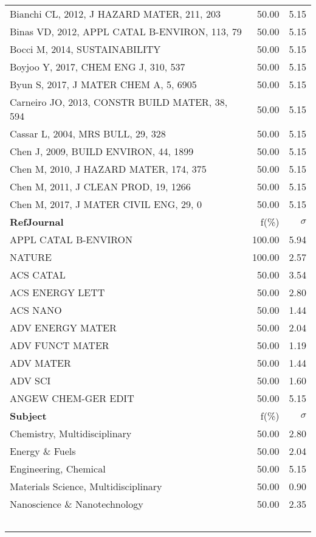\documentclass[a4paper,11pt]{report}
\begin{document}
\begin{landscape}
\begin{table}[!ht]
{\begin{tabular}{|p{8cm} r r|}
Bianchi CL, 2012, J HAZARD MATER, 211, 203 & 50.00 & 5.15\\
Binas VD, 2012, APPL CATAL B-ENVIRON, 113, 79 & 50.00 & 5.15\\
Bocci M, 2014, SUSTAINABILITY & 50.00 & 5.15\\
Boyjoo Y, 2017, CHEM ENG J, 310, 537 & 50.00 & 5.15\\
Byun S, 2017, J MATER CHEM A, 5, 6905 & 50.00 & 5.15\\
Carneiro JO, 2013, CONSTR BUILD MATER, 38, 594 & 50.00 & 5.15\\
Cassar L, 2004, MRS BULL, 29, 328 & 50.00 & 5.15\\
Chen J, 2009, BUILD ENVIRON, 44, 1899 & 50.00 & 5.15\\
Chen M, 2010, J HAZARD MATER, 174, 375 & 50.00 & 5.15\\
Chen M, 2011, J CLEAN PROD, 19, 1266 & 50.00 & 5.15\\
Chen M, 2017, J MATER CIVIL ENG, 29, 0 & 50.00 & 5.15\\
\hline
{\bf RefJournal }& f(\%) & $\sigma$\\
\hline
APPL CATAL B-ENVIRON & 100.00 & 5.94\\
NATURE & 100.00 & 2.57\\
ACS CATAL & 50.00 & 3.54\\
ACS ENERGY LETT & 50.00 & 2.80\\
ACS NANO & 50.00 & 1.44\\
ADV ENERGY MATER & 50.00 & 2.04\\
ADV FUNCT MATER & 50.00 & 1.19\\
ADV MATER & 50.00 & 1.44\\
ADV SCI & 50.00 & 1.60\\
ANGEW CHEM-GER EDIT & 50.00 & 5.15\\
\hline
{\bf Subject }& f(\%) & $\sigma$\\
\hline
Chemistry, Multidisciplinary & 50.00 & 2.80\\
Energy \& Fuels & 50.00 & 2.04\\
Engineering, Chemical & 50.00 & 5.15\\
Materials Science, Multidisciplinary & 50.00 & 0.90\\
Nanoscience \& Nanotechnology & 50.00 & 2.35\\
 &  & \\
 &  & \\
 &  & \\
 &  & \\
 &  & \\
\hline
\end{tabular}
}
\end{table}


\end{landscape}
\end{document}
